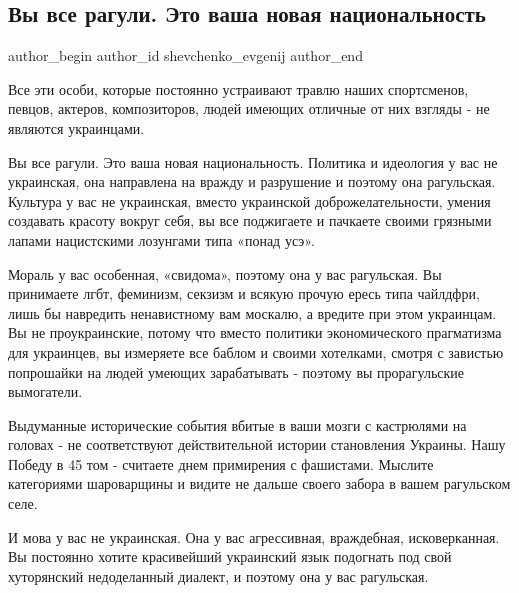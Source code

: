  
 
 
 
 
 
\subsection{Вы все рагули. Это ваша новая национальность}
\label{sec:09_08_2021.fb.shevchenko_evgenij.1.vy_vse_raguli}
 
\ifcmt
 author_begin
   author_id shevchenko_evgenij
 author_end
\fi

Все эти особи, которые постоянно устраивают травлю наших спортсменов, певцов,
актеров, композиторов, людей имеющих отличные от них взгляды - не являются
украинцами. 

Вы все рагули. Это ваша новая национальность. Политика и идеология  у вас не
украинская, она  направлена на вражду и разрушение  и поэтому она рагульская.
Культура  у вас не украинская, вместо украинской доброжелательности, умения
создавать красоту вокруг себя, вы все поджигаете и пачкаете своими грязными
лапами  нацистскими лозунгами типа  «понад усэ». 

Мораль у вас особенная, «свидома», поэтому она у вас рагульская. Вы принимаете
лгбт, феминизм, секзизм и всякую прочую  ересь типа  чайлдфри, лишь бы
навредить ненавистному вам москалю, а вредите при этом украинцам. Вы не
проукраинские, потому что вместо политики экономического прагматизма для
украинцев, вы измеряете все баблом и своими хотелками, смотря  с завистью
попрошайки на людей умеющих зарабатывать - поэтому  вы прорагульские
вымогатели.   

Выдуманные исторические  события вбитые в ваши мозги с кастрюлями на головах -
не соответствуют действительной истории  становления Украины. Нашу Победу  в 45
том - считаете днем примирения с фашистами. Мыслите  категориями шароварщины и
видите не дальше своего забора в вашем рагульском селе. 

И мова у вас не украинская. Она у вас агрессивная, враждебная, исковерканная.
Вы  постоянно хотите красивейший украинский язык подогнать под свой хуторянский
недоделанный диалект, и поэтому она у вас рагульская. 


